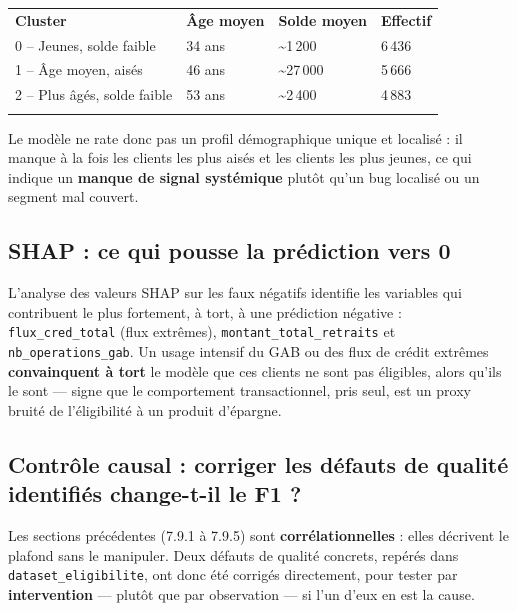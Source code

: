 \documentclass[11pt,a4paper]{report}
\let\oldtoprule\toprule
\renewcommand{\toprule}{\arrayrulecolor{corpslate}\oldtoprule\arrayrulecolor{black}}
\let\oldmidrule\midrule
\renewcommand{\midrule}{\arrayrulecolor{emsigreen}\oldmidrule\arrayrulecolor{black}}
\let\oldbottomrule\bottomrule
\renewcommand{\bottomrule}{\arrayrulecolor{corpslate}\oldbottomrule\arrayrulecolor{black}}
\begin{document}
\begin{center}
\begin{tabular}{@{}p{4.4cm}p{3cm}p{3.2cm}p{2.6cm}@{}}
\toprule
\rowcolor{corpslate!10}
\textbf{Cluster} & \textbf{Âge moyen} & \textbf{Solde moyen} & \textbf{Effectif} \\
\midrule
0 -- Jeunes, solde faible & 34 ans & \textasciitilde 1\,200 & 6\,436 \\
1 -- Âge moyen, aisés & 46 ans & \textasciitilde 27\,000 & 5\,666 \\
2 -- Plus âgés, solde faible & 53 ans & \textasciitilde 2\,400 & 4\,883 \\
\bottomrule
\end{tabular}
\end{center}

Le modèle ne rate donc pas un profil démographique unique et localisé : il
manque à la fois les clients les plus aisés et les clients les plus
jeunes, ce qui indique un \textbf{manque de signal systémique} plutôt
qu'un bug localisé ou un segment mal couvert.

\subsection{SHAP : ce qui pousse la prédiction vers 0}
L'analyse des valeurs SHAP sur les faux négatifs identifie les variables
qui contribuent le plus fortement, à tort, à une prédiction négative :
\texttt{flux\_cred\_total} (flux extrêmes), \texttt{montant\_total\_retraits}
et \texttt{nb\_operations\_gab}. Un usage intensif du GAB ou des flux de
crédit extrêmes \textbf{convainquent à tort} le modèle que ces clients ne
sont pas éligibles, alors qu'ils le sont — signe que le comportement
transactionnel, pris seul, est un proxy bruité de l'éligibilité à un
produit d'épargne.

\subsection{Contrôle causal : corriger les défauts de qualité identifiés change-t-il le F1 ?}
\statutFait{}
Les sections précédentes (7.9.1 à 7.9.5) sont \textbf{corrélationnelles} :
elles décrivent le plafond sans le manipuler. Deux défauts de qualité
concrets, repérés dans \texttt{dataset\_eligibilite}, ont donc été
corrigés directement, pour tester par \textbf{intervention} — plutôt que
par observation — si l'un d'eux en est la cause.
\end{document}
